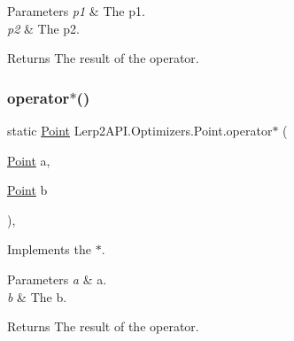 \begin{DoxyParams}{Parameters}
{\em p1} & The p1.\\
\hline
{\em p2} & The p2.\\
\hline
\end{DoxyParams}
\begin{DoxyReturn}{Returns}
The result of the operator.
\end{DoxyReturn}
\mbox{\label{struct_lerp2_a_p_i_1_1_optimizers_1_1_point_a91abfb466d803983aa737c0966607935}} 
\subsubsection{\texorpdfstring{operator$\ast$()}{operator*()}\hspace{0.1cm}{\footnotesize\ttfamily [1/2]}}
{\footnotesize\ttfamily static \hyperlink{struct_lerp2_a_p_i_1_1_optimizers_1_1_point}{Point} Lerp2\+A\+P\+I.\+Optimizers.\+Point.\+operator$\ast$ (\begin{DoxyParamCaption}\item[{\hyperlink{struct_lerp2_a_p_i_1_1_optimizers_1_1_point}{Point}}]{a,  }\item[{\hyperlink{struct_lerp2_a_p_i_1_1_optimizers_1_1_point}{Point}}]{b }\end{DoxyParamCaption})\hspace{0.3cm}{\ttfamily [inline]}, {\ttfamily [static]}}



Implements the $\ast$. 


\begin{DoxyParams}{Parameters}
{\em a} & a.\\
\hline
{\em b} & The b.\\
\hline
\end{DoxyParams}
\begin{DoxyReturn}{Returns}
The result of the operator.
\end{DoxyReturn}
\mbox{\label{struct_lerp2_a_p_i_1_1_optimizers_1_1_point_a8f20033c1c8b2033fb24eea4f3f4500c}} 
